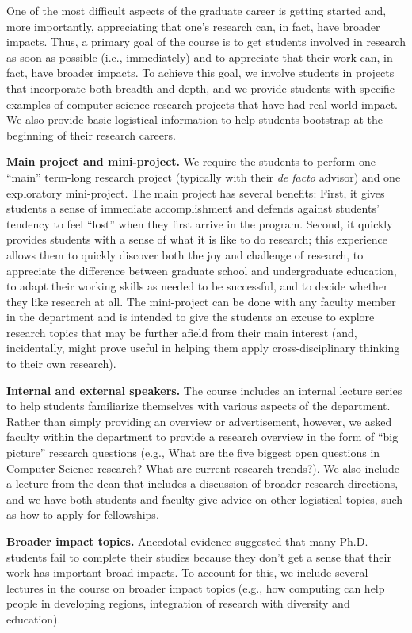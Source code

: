 One of the most difficult aspects of the graduate career is getting
started and, more importantly, appreciating that one's research can, in
fact, have broader impacts.  Thus, a primary goal of the course is to
get students involved in research as soon as possible (i.e.,
immediately) and to appreciate that their work can, in fact, have
broader impacts.  To achieve this goal, we involve students in projects
that incorporate both breadth and depth, and we provide students with
specific examples of computer science research projects that have had
real-world impact.  We also provide basic logistical information to help
students bootstrap at the beginning of their research careers.

\vspace*{0.1in}
\noindent
{\bf Main project and mini-project.}  We require the students to perform
one ``main'' term-long research project (typically with their {\em de
  facto} advisor) and one exploratory mini-project.  The main project
has several benefits: First, it gives students a sense of immediate
accomplishment and defends against students' tendency to feel ``lost''
when they first arrive in the program.  Second, it quickly provides
students with a sense of what it is like to do research; this experience
allows them to quickly discover both the joy and challenge of research,
to appreciate the difference between graduate school and undergraduate
education, to adapt their working skills as needed to be successful, and
to decide whether they like research at all.  The mini-project can be
done with any faculty member in the department and is intended to give
the students an excuse to explore research topics that may be further
afield from their main interest (and, incidentally, might prove useful
in helping them apply cross-disciplinary thinking to their own
research). 

\vspace*{0.1in}
\noindent
{\bf Internal and external speakers.}  The course includes an internal
lecture series to help students familiarize themselves with various
aspects of the department.  Rather than simply providing an overview or
advertisement, however, we asked faculty within the department to
provide a research overview in the form of ``big picture'' research
questions (e.g., What are the five biggest open questions in Computer
Science research? What are current research trends?).  We also include a
lecture from the dean that includes a discussion of broader research
directions, and we have both students and faculty give advice on other
logistical topics, such as how to apply for fellowships.

\vspace*{0.1in}
\noindent
{\bf Broader impact topics.}  Anecdotal evidence suggested that many
Ph.D. students fail to complete their studies because they don't get a
sense that their work has important broad impacts.  To account for this,
we include several lectures in the course on broader impact topics
(e.g., how computing can help people in developing regions, integration
of research with diversity and education).  
